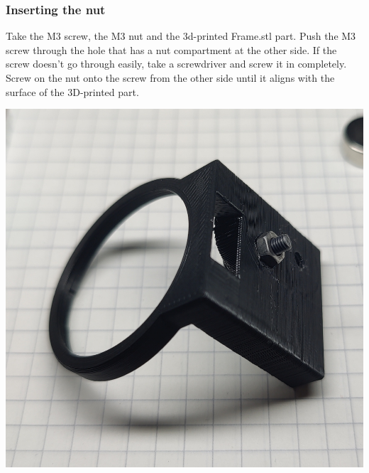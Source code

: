 \documentclass[]{article}
\begin{document}
\subsubsection{Inserting the nut}
\begin{minipage}[t]{0.5\linewidth}
	\vspace{0pt}
	Take the M3 screw, the M3 nut and the 3d-printed Frame.stl part. Push the M3 screw through the hole that has a nut compartment at the other side. If the screw doesn't go through easily, take a screwdriver and screw it in completely. Screw on the nut onto the screw from the other side until it aligns with the surface of the 3D-printed part.
\end{minipage}
\hfill
\begin{minipage}[t]{0.4\linewidth}
	\vspace{0pt}
	\includegraphics[width=\linewidth]{images/01_displayunit/08_prepare_nutslot.jpg}
\end{minipage}
\end{document}
